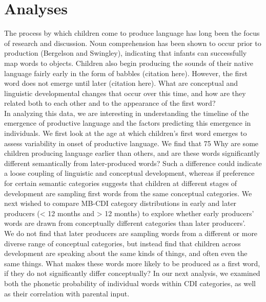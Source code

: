 \documentclass[10pt,letterpaper]{article}
\begin{document}
\section{Analyses}
The process by which children come to produce language has long been the focus of research and discussion. Noun comprehension has been shown to occur prior to production (Bergelson and Swingley), indicating that infants can successfully map words to objects. Children also begin producing the sounds of their native language fairly early in the form of babbles (citation here). However, the first word does not emerge until later (citation here). What are conceptual and linguistic developmental changes that occur over this time, and how are they related both to each other and to the appearance of the first word?\\
In analyzing this data, we are interesting in understanding the timeline of the emergence of productive language and the factors predicting this emergence in individuals. We first look at the age at which children's first word emerges to assess variability in onset of productive language. We find that 75%
Why are some children producing language earlier than others, and are these words significantly different semantically from later-produced words? Such a difference could indicate a loose coupling of linguistic and conceptual development, whereas if preference for certain semantic categories suggests that children at different stages of development are sampling first words from the same conceptual categories. We next wished to compare MB-CDI category distributions in early and later producers (< 12 months and > 12 months) to explore whether early producers' words are drawn from conceptually different categories than later producers'.\\
We do not find that later producers are sampling words from a different or more diverse range of conceptual categories, but instead find that children across development are speaking about the same kinds of things, and often even the same things. What makes these words more likely to be produced as a first word, if they do not significantly differ conceptually? In our next analysis, we examined both the phonetic probability of individual words within CDI categories, as well as their correlation with parental input.\\
\end{document}
